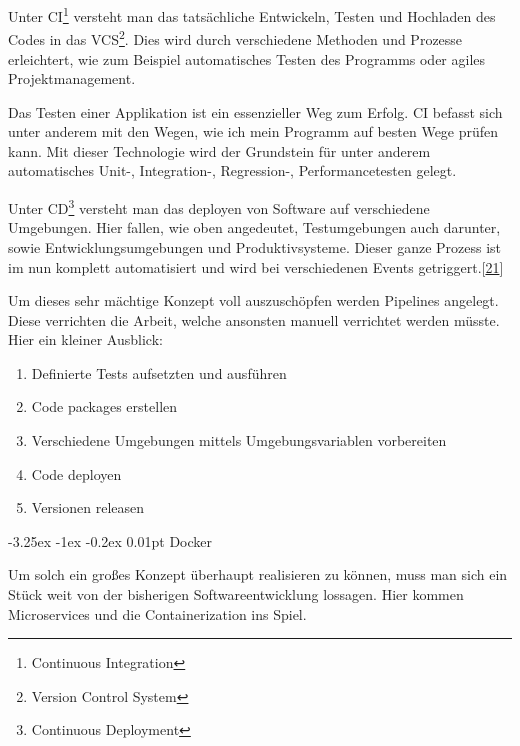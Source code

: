 \documentclass[
    headings=optiontotocandhead,%
    twoside,
    numbers=noenddot,%
    12pt, %
    titlepage, %
    parskip=full, %
    listof=leveldown, 
    numbers=noenddot, %
    a4paper,DIV=14,
    BCOR=15mm,
]{scrbook}
\makeatletter
\providecommand{\tightlist}{%
  \setlength{\itemsep}{0pt}\setlength{\parskip}{0pt}}
\renewcommand\paragraph{\@startsection{paragraph}{4}{\z@}%
    {-3.25ex \@plus -1ex \@minus -0.2ex}%
    {0.01pt}%
    {\raggedsection\normalfont\sectfont\nobreak\size@paragraph}%
  }
\makeatother
\begin{document}
Unter CI\footnote{Continuous Integration} versteht man das tatsächliche
Entwickeln, Testen und Hochladen des Codes in das VCS\footnote{Version
  Control System}. Dies wird durch verschiedene Methoden und Prozesse
erleichtert, wie zum Beispiel automatisches Testen des Programms oder
agiles Projektmanagement.

Das Testen einer Applikation ist ein essenzieller Weg zum Erfolg. CI
befasst sich unter anderem mit den Wegen, wie ich mein Programm auf
besten Wege prüfen kann. Mit dieser Technologie wird der Grundstein für
unter anderem automatisches Unit-, Integration-, Regression-,
Performancetesten gelegt.

Unter CD\footnote{Continuous Deployment} versteht man das deployen von
Software auf verschiedene Umgebungen. Hier fallen, wie oben angedeutet,
Testumgebungen auch darunter, sowie Entwicklungsumgebungen und
Produktivsysteme. Dieser ganze Prozess ist im nun komplett automatisiert
und wird bei verschiedenen Events
getriggert.{[}\protect\hyperlink{ref-bestarion}{21}{]}

Um dieses sehr mächtige Konzept voll auszuschöpfen werden Pipelines
angelegt. Diese verrichten die Arbeit, welche ansonsten manuell
verrichtet werden müsste. Hier ein kleiner Ausblick:

\begin{enumerate}
\def\labelenumi{\arabic{enumi}.}
\tightlist
\item
  Definierte Tests aufsetzten und ausführen
\item
  Code packages erstellen
\item
  Verschiedene Umgebungen mittels Umgebungsvariablen vorbereiten
\item
  Code deployen
\item
  Versionen releasen
\end{enumerate}

\hypertarget{docker}{%
\paragraph{Docker}\label{docker}}

Um solch ein großes Konzept überhaupt realisieren zu können, muss man
sich ein Stück weit von der bisherigen Softwareentwicklung lossagen.
Hier kommen Microservices und die Containerization ins Spiel.
\end{document}
